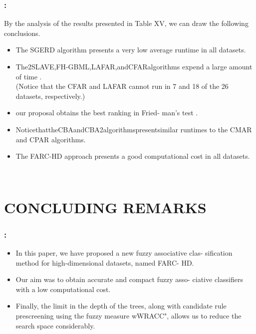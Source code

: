 \documentclass{beamer}
\begin{document}
\begin{CJK*}{UTF8}{bsmi}

\begin{frame}
	\frametitle{\insertsection : \insertsubsection}

	\begin{block}{By the analysis of the results presented in Table XV, we can draw the following conclusions. }
		~\\
	\begin{itemize}
		\item The SGERD algorithm presents a very low average runtime in all datasets.
		\item The2SLAVE,FH-GBML,LAFAR,andCFARalgorithms expend a large amount of time .\\ (Notice that the CFAR and LAFAR cannot run in 7 and 18 of the 26 datasets, respectively.)
		\item our proposal obtains the best ranking in Fried- man’s test .
		\item NoticethattheCBAandCBA2algorithmspresentsimilar runtimes to the CMAR and CPAR algorithms.
		\item The FARC-HD approach presents a good computational cost in all datasets.
	\end{itemize}
		~\\
	\end{block}
	
\end{frame}


\section{CONCLUDING REMARKS}


\begin{frame}
	\frametitle{\insertsection : \insertsubsection}
	

		\begin{itemize}
			\item In this paper, we have proposed a new fuzzy associative clas- sification method for high-dimensional datasets, named FARC- HD.
			\item Our aim was to obtain accurate and compact fuzzy asso- ciative classifiers with a low computational cost.
			\item Finally, the limit in the depth of the trees, along with candidate rule prescreening using the fuzzy measure wWRACC", allows us to reduce the search space considerably.
		\end{itemize}


\end{frame}
\end{CJK*}
\end{document}
